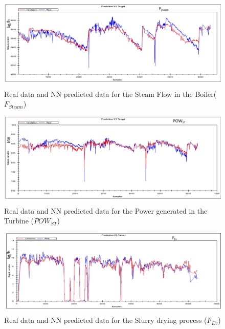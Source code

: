 \begin{figure}
\centering
\includegraphics[width=1\textwidth]{ANN-EXHAUSTRECOVERY.pdf}
\caption{Real data and NN predicted data for the Steam Flow in the Boiler($F_{Steam}$) }
\label{Fboiler}
\end{figure}

\begin{figure}
\centering
\includegraphics[width=1\textwidth]{ANN-ST.pdf}
\caption{Real data and NN predicted data for the Power generated in the Turbine ($POW_{ST}$) }
\label{Pturbine}
\end{figure}

\begin{figure}
\centering
\includegraphics[width=1\textwidth]{ANN-Evaporator.pdf}
\caption{Real data and NN predicted data for the Slurry drying process ($F_{Ev}$) }
\label{Pturbine}
\end{figure}
